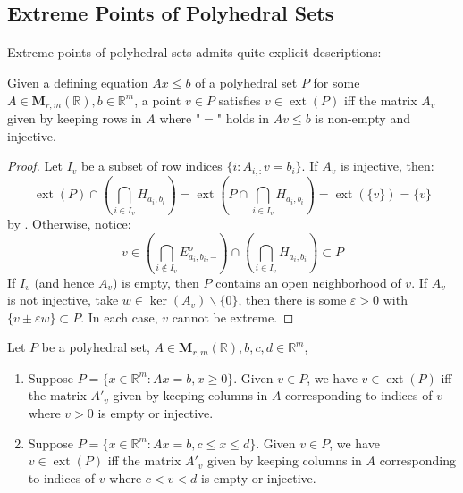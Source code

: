 \subsection{Extreme Points of Polyhedral Sets}

\paragraph{}Extreme points of polyhedral sets admits quite explicit descriptions:

\begin{prop}\label{prop:017-characterization-polyhedral-extreme}
	Given a defining equation $Ax\leq b$ of a polyhedral set $P$ for some $A\in \mathbf{M}_{r,m}(\mathbb{R}),b\in \mathbb{R}^m$, a point $v\in P$ satisfies $v\in \operatorname{ext}(P)$ iff the matrix $A_v$ given by keeping rows in $A$ where "$=$" holds in $Av\leq b$ is non-empty and injective.
\end{prop}

\begin{proof}
	Let $I_v$ be a subset of row indices $\{i:A_{i,:}v=b_i\}$. If $A_v$ is injective, then:
	\[
		\operatorname{ext}(P)\cap\left(\bigcap_{i\in I_v}H_{a_i,b_i}\right)=
		\operatorname{ext}\left(P\cap\bigcap_{i\in I_v}H_{a_i,b_i}\right)=\operatorname{ext}\left(\{v\}\right)=\{v\}
	\]
	by . Otherwise, notice:
	\[
		v\in\left(\bigcap_{i\notin I_v}E_{a_i,b_i,-}^o\right)\cap\left(\bigcap_{i\in I_v}H_{a_i,b_i}\right)\subset P
	\]
	If $I_v$ (and hence $A_v$) is empty, then $P$ contains an open neighborhood of $v$. If $A_v$ is not injective, take $w\in \operatorname{ker}(A_v)\smallsetminus\{0\}$, then there is some $\varepsilon >0$ with $\{v\pm \varepsilon w\}\subset P$. In each case, $v$ cannot be extreme.
\end{proof}

\begin{coro}[Variants]\label{coro:017-char-variants}
	Let $P$ be a polyhedral set, $A\in \mathbf{M}_{r,m}(\mathbb{R}),b,c,d\in \mathbb{R}^m$,
	\begin{enumerate}[label=(\alph*)]
		\item Suppose $P=\{x\in \mathbb{R}^m:Ax=b,x\geq 0\}$. Given $v\in P$, we have $v\in \operatorname{ext}(P)$ iff the matrix $A'_v$ given by keeping columns in $A$ corresponding to indices of $v$ where $v> 0$ is empty or injective.
		\item Suppose $P=\{x\in \mathbb{R}^m:Ax=b,c\leq x\leq d\}$. Given $v\in P$, we have $v\in \operatorname{ext}(P)$ iff the matrix $A'_v$ given by keeping columns in $A$ corresponding to indices of $v$ where $c<v<d$ is empty or injective.
	\end{enumerate}
\end{coro}

